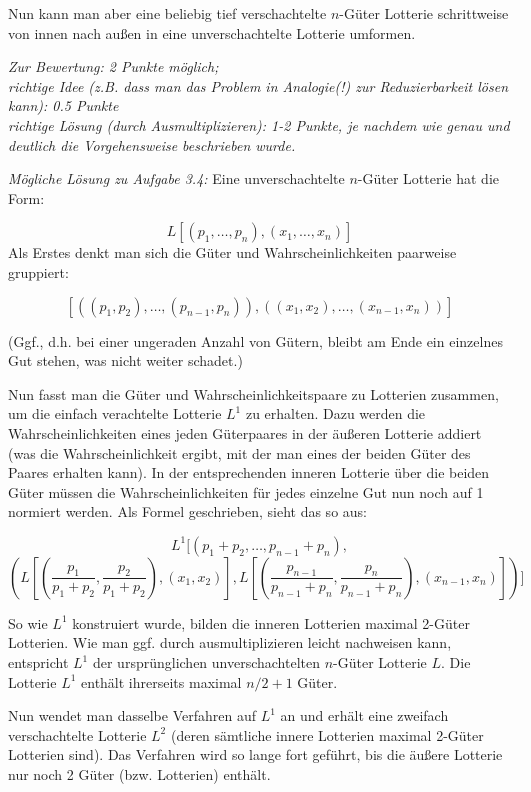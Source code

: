 \documentclass[10pt, a4paper, german]{article}
\numberwithin {equation}{section}
\begin{document}
Nun kann man aber eine beliebig tief verschachtelte $n$-Güter Lotterie
schrittweise von innen nach außen in eine unverschachtelte Lotterie umformen.

\vspace{0.25cm}

{\em Zur Bewertung: 2 Punkte möglich; \\
richtige Idee (z.B. dass man das Problem in Analogie(!) zur Reduzierbarkeit
lösen kann): 0.5 Punkte\\
richtige Lösung (durch Ausmultiplizieren): 1-2 Punkte, je nachdem wie genau und
deutlich die Vorgehensweise beschrieben wurde.}

\vspace{0.5cm}

{\em Mögliche Lösung zu Aufgabe 3.4:} Eine unverschachtelte $n$-Güter Lotterie
hat die Form:

\[
L[(p_1,\ldots, p_n),(x_1,\ldots, x_n)]
\]
Als Erstes denkt man sich die Güter und Wahrscheinlichkeiten
paarweise gruppiert:

\[
[((p_1, p_2), \ldots, (p_{n-1}, p_n)),((x_1, x_2), \ldots, (x_{n-1}, x_n))]
\]

(Ggf., d.h. bei einer ungeraden Anzahl von Gütern, bleibt am Ende ein einzelnes
Gut stehen, was nicht weiter schadet.)

Nun fasst man die Güter und Wahrscheinlichkeitspaare zu Lotterien zusammen, um
die einfach verachtelte Lotterie $L^1$ zu erhalten. Dazu werden die
Wahrscheinlichkeiten eines jeden Güterpaares in der äußeren Lotterie addiert (was
die Wahrscheinlichkeit ergibt, mit der man eines der beiden Güter des Paares
erhalten kann). In der entsprechenden inneren Lotterie über die beiden Güter
müssen die Wahrscheinlichkeiten für jedes einzelne Gut nun noch auf 1 normiert
werden. Als Formel geschrieben, sieht das so aus:

\[
L^1[(p_1+p_2, \ldots, p_{n-1}+p_n),
\]
\[
(L[(\frac{p_1}{p_1+p_2},
\frac{p_2}{p_1+p_2}),(x_1, x_2)], L[(\frac{p_{n-1}}{p_{n-1}+p_n},
\frac{p_n}{p_{n-1}+p_n}),(x_{n-1}, x_n)])]
\]

So wie $L^1$ konstruiert wurde, bilden die inneren Lotterien maximal 2-Güter
Lotterien. Wie man ggf. durch ausmultiplizieren leicht nachweisen kann,
entspricht $L^1$ der ursprünglichen unverschachtelten $n$-Güter Lotterie $L$.
Die Lotterie $L^1$ enthält ihrerseits maximal $n/2+1$ Güter.

Nun wendet man dasselbe Verfahren auf $L^1$ an und erhält eine zweifach
verschachtelte Lotterie $L^2$ (deren sämtliche innere Lotterien
maximal 2-Güter Lotterien sind). Das Verfahren wird so lange fort geführt, bis
die äußere Lotterie nur noch 2 Güter (bzw. Lotterien) enthält.
\end{document}
